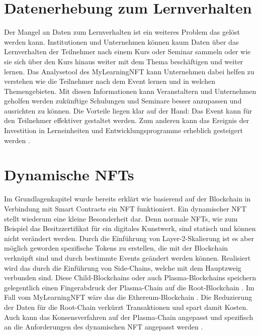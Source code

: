 \section{Datenerhebung zum Lernverhalten}

Der Mangel an Daten zum Lernverhalten ist ein weiteres Problem das gelöst werden kann.
Institutionen und Unternehmen können kaum Daten über das Lernverhalten der Teilnehmer nach einem Kurs oder Seminar sammeln
oder wie sie sich über den Kurs hinaus weiter mit dem Thema beschäftigen und weiter lernen.
Das Analysetool des MyLearning\ac{NFT} kann Unternehmen dabei helfen zu verstehen wie die Teilnehmer nach dem Event lernen und in welchen Themengebieten.
Mit diesen Informationen kann Veranstaltern und Unternehmen geholfen werden zukünftige Schulungen und Seminare besser anzupassen und ausrichten zu können.
Die Vorteile liegen klar auf der Hand:
Das Event kann für den Teilnehmer effektiver gestaltet werden.
Zum anderen kann das Ereignis der Investition in Lerneinheiten und Entwicklungsprogramme erheblich gesteigert werden \parencite[vgl.][]{MyLearningNFT.2022}.

\section{Dynamische NFTs}

Im Grundlagenkapitel wurde bereits erklärt wie basierend auf der Blockchain in Verbindung mit Smart Contracts ein \ac{NFT} funktioniert.
Ein dynamischer \ac{NFT} stellt wiederum eine kleine Besonderheit dar.
Denn \dq normale\dq{} \ac{NFT}s, wie zum Beispiel das Besitzzertifikat für ein digitales Kunstwerk, sind statisch und können nicht verändert werden.
Durch die Einführung von Layer-2-Skalierung ist es aber möglich geworden spezifische Tokens zu erstellen,
die mit der Blockchain verknüpft sind und durch bestimmte Events geändert werden können.
Realisiert wird das durch die Einführung von Side-Chains, welche mit dem Hauptzweig verbunden sind.
Diese Child-Blockchains oder auch Plasma-Blockchains speichern gelegentlich einen Fingerabdruck der Plasma-Chain auf die Root-Blockchain \parencite[vgl.][]{BitcoinSuisse.2020}.
Im Fall vom MyLearning\ac{NFT} wäre das die Ethereum-Blockchain \parencite[vgl.][]{MyLearningNFT.2022}.
Die Reduzierung der Daten für die Root-Chain verkürzt Transaktionen und spart damit Kosten.
Auch kann das Konsensverfahren auf der Plasma-Chain angepasst und spezifisch an die Anforderungen des dynamischen \ac{NFT} angepasst werden \parencite[vgl.][]{BitcoinSuisse.2020}.

